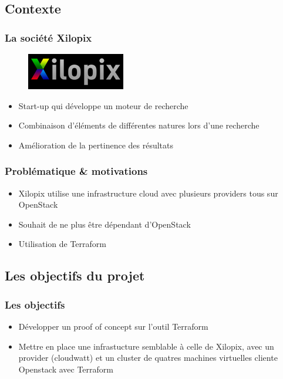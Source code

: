 \documentclass[11pt]{beamer} %
\begin{document}
		\subsection{Contexte}
			\begin{frame}
				\frametitle{La société Xilopix}
					
				\begin{figure}
					\begin{center}
						\includegraphics[scale=0.8]{img2.png}
					\end{center}
				\end{figure}
				
				\begin{itemize}
					\item Start-up qui développe un moteur de recherche
					\item Combinaison d'éléments de différentes natures lors d'une recherche
					\item Amélioration de la pertinence des résultats
				\end{itemize}
			\end{frame}
		
		
			\begin{frame}
				\frametitle{Problématique \& motivations}
				\begin{itemize}
					\item Xilopix utilise une infrastructure cloud avec plusieurs providers tous sur OpenStack
					\item Souhait de ne plus être dépendant d'OpenStack 
					\item Utilisation de Terraform
				\end{itemize}
			\end{frame}
		
		
		\subsection{Les objectifs du projet}
			\begin{frame}
				\frametitle{Les objectifs}
				\begin{itemize}
					\item Développer un proof of concept sur l'outil Terraform
					\item Mettre en place une infrastucture semblable à celle de Xilopix, avec un provider (cloudwatt) et un cluster de quatres machines virtuelles cliente Openstack avec Terraform
				\end{itemize}
			\end{frame}
		
\end{document}
